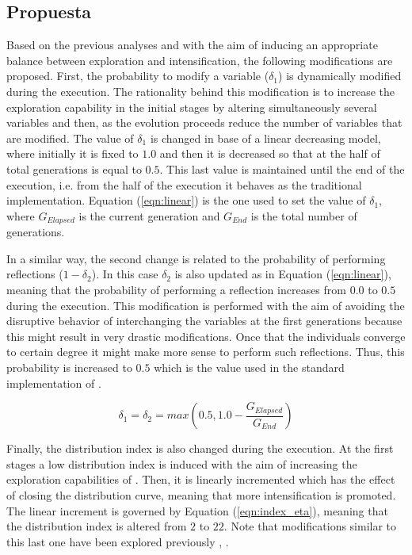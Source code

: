 \subsection{Propuesta}

Based on the previous analyses and with the aim of inducing an appropriate balance between 
exploration and intensification, the following modifications are proposed.
%
First, the probability to modify a variable ($\delta_1$) is dynamically
modified during the execution.
%
The rationality behind this modification is to increase the exploration capability in the initial stages
by altering simultaneously several variables and then, as the evolution proceeds reduce the number of variables
that are modified.
%
The value of $\delta_1$ is changed in base of a linear decreasing model, where initially it is fixed to $1.0$ and 
then it is decreased so that at the half of total generations is equal to $0.5$.
%
This last value is maintained until the end of the execution, i.e. from the half of the execution it behaves as the 
traditional \SBX{} implementation.
%
Equation (\ref{eqn:linear}) is the one used to set the value of $\delta_1$, where $G_{Elapsed}$ is the current generation 
and $G_{End}$ is the total number of generations.

In a similar way, the second change is related to the probability of performing reflections ($1 - \delta_2$).
%
In this case $\delta_2$ is also updated as in Equation (\ref{eqn:linear}), meaning that the probability of performing
a reflection increases from $0.0$ to $0.5$ during the execution.
%
This modification is performed with the aim of avoiding the disruptive behavior of interchanging the variables at the
first generations because this might result in very drastic modifications.
%
Once that the individuals converge to certain degree it might make more sense to perform such reflections.
%
Thus, this probability is increased to $0.5$ which is the value used in the standard implementation of \SBX{}.

\begin{equation}\label{eqn:linear}
	\delta_1 = \delta_2 = max \left (0.5, 1.0 - \frac{G_{Elapsed}}{G_{End}} \right )
\end{equation}

Finally, the distribution index is also changed during the execution. 
%
At the first stages a low distribution index is induced with the aim of increasing the exploration capabilities 
of \SBX{}.
%
Then, it is linearly incremented which has the effect of closing the distribution curve, meaning that more intensification is
promoted.
%
The linear increment is governed by Equation (\ref{eqn:index_eta}), meaning that the distribution index is altered
from $2$ to $22$.
%
Note that modifications similar to this last one have been explored previously 
\cite{zitzler1999multiobjective}, \cite{hamdan2012distribution}.
%

